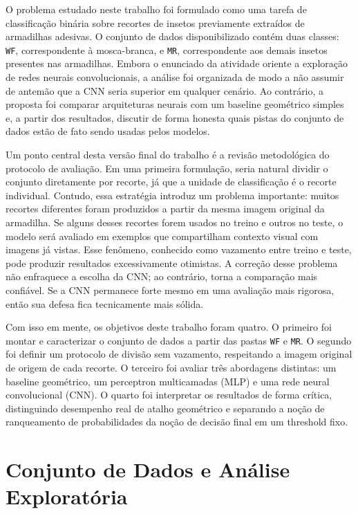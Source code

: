 \documentclass[12pt]{article}
\begin{document}
O problema estudado neste trabalho foi formulado como uma tarefa de
classificação binária sobre recortes de insetos previamente extraídos de
armadilhas adesivas. O conjunto de dados disponibilizado contém duas classes:
\texttt{WF}, correspondente à mosca-branca, e \texttt{MR}, correspondente aos
demais insetos presentes nas armadilhas. Embora o enunciado da atividade
oriente a exploração de redes neurais convolucionais, a análise foi organizada
de modo a não assumir de antemão que a CNN seria superior em qualquer cenário.
Ao contrário, a proposta foi comparar arquiteturas neurais com um baseline
geométrico simples e, a partir dos resultados, discutir de forma honesta quais
pistas do conjunto de dados estão de fato sendo usadas pelos modelos.

Um ponto central desta versão final do trabalho é a revisão metodológica do
protocolo de avaliação. Em uma primeira formulação, seria natural dividir o
conjunto diretamente por recorte, já que a unidade de classificação é o
recorte individual. Contudo, essa estratégia introduz um problema importante:
muitos recortes diferentes foram produzidos a partir da mesma imagem original da
armadilha. Se alguns desses recortes forem usados no treino e outros no teste,
o modelo será avaliado em exemplos que compartilham contexto visual com
imagens já vistas. Esse fenômeno, conhecido como vazamento entre treino e
teste, pode produzir resultados excessivamente otimistas. A correção desse
problema não enfraquece a escolha da CNN; ao contrário, torna a comparação mais
confiável. Se a CNN permanece forte mesmo em uma avaliação mais rigorosa, então
sua defesa fica tecnicamente mais sólida.

Com isso em mente, os objetivos deste trabalho foram quatro. O primeiro foi
montar e caracterizar o conjunto de dados a partir das pastas \texttt{WF} e
\texttt{MR}. O segundo foi definir um protocolo de divisão sem vazamento,
respeitando a imagem original de origem de cada recorte. O terceiro foi avaliar
três abordagens distintas: um baseline geométrico, um perceptron multicamadas
(MLP) e uma rede neural convolucional (CNN). O quarto foi interpretar os
resultados de forma crítica, distinguindo desempenho real de atalho geométrico
e separando a noção de ranqueamento de probabilidades da noção de decisão final
em um threshold fixo.

\section{Conjunto de Dados e Análise Exploratória}
\end{document}
